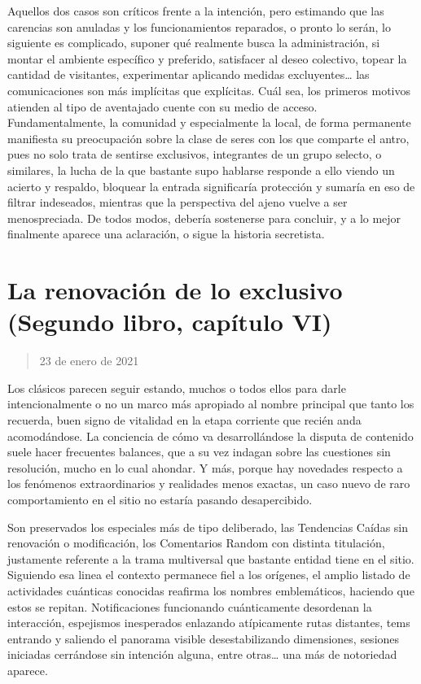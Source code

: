\documentclass[
]{book}
\begin{document}
Aquellos dos casos son críticos frente a la intención, pero estimando que las carencias son anuladas y los funcionamientos reparados, o pronto lo serán, lo siguiente es complicado, suponer qué realmente busca la administración, si montar el ambiente específico y preferido, satisfacer al deseo colectivo, topear la cantidad de visitantes, experimentar aplicando medidas excluyentes\ldots{} las comunicaciones son más implícitas que explícitas. Cuál sea, los primeros motivos atienden al tipo de aventajado cuente con su medio de acceso. Fundamentalmente, la comunidad y especialmente la local, de forma permanente manifiesta su preocupación sobre la clase de seres con los que comparte el antro, pues no solo trata de sentirse exclusivos, integrantes de un grupo selecto, o similares, la lucha de la que bastante supo hablarse responde a ello viendo un acierto y respaldo, bloquear la entrada significaría protección y sumaría en eso de filtrar indeseados, mientras que la perspectiva del ajeno vuelve a ser menospreciada. De todos modos, debería sostenerse para concluir, y a lo mejor finalmente aparece una aclaración, o sigue la historia secretista.

\hypertarget{la-renovaciuxf3n-de-lo-exclusivo-segundo-libro-capuxedtulo-vi}{%
\section{La renovación de lo exclusivo (Segundo libro, capítulo VI)}\label{la-renovaciuxf3n-de-lo-exclusivo-segundo-libro-capuxedtulo-vi}}

\begin{quote}
23 de enero de 2021
\end{quote}

Los clásicos parecen seguir estando, muchos o todos ellos para darle intencionalmente o no un marco más apropiado al nombre principal que tanto los recuerda, buen signo de vitalidad en la etapa corriente que recién anda acomodándose. La conciencia de cómo va desarrollándose la disputa de contenido suele hacer frecuentes balances, que a su vez indagan sobre las cuestiones sin resolución, mucho en lo cual ahondar. Y más, porque hay novedades respecto a los fenómenos extraordinarios y realidades menos exactas, un caso nuevo de raro comportamiento en el sitio no estaría pasando desapercibido.

Son preservados los especiales más de tipo deliberado, las Tendencias Caídas sin renovación o modificación, los Comentarios Random con distinta titulación, justamente referente a la trama multiversal que bastante entidad tiene en el sitio. Siguiendo esa linea el contexto permanece fiel a los orígenes, el amplio listado de actividades cuánticas conocidas reafirma los nombres emblemáticos, haciendo que estos se repitan. Notificaciones funcionando cuánticamente desordenan la interacción, espejismos inesperados enlazando atípicamente rutas distantes, tems entrando y saliendo el panorama visible desestabilizando dimensiones, sesiones iniciadas cerrándose sin intención alguna, entre otras\ldots{} una más de notoriedad aparece.
\end{document}
